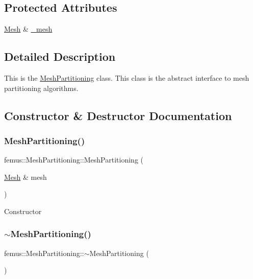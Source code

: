 \subsection*{Protected Attributes}
\begin{DoxyCompactItemize}
\item 
\mbox{\hyperlink{classfemus_1_1_mesh}{Mesh}} \& \mbox{\hyperlink{classfemus_1_1_mesh_partitioning_ac7a47c3281981a8c39a1cd9751b07955}{\+\_\+mesh}}
\end{DoxyCompactItemize}


\subsection{Detailed Description}
This is the {\ttfamily \mbox{\hyperlink{classfemus_1_1_mesh_partitioning}{Mesh\+Partitioning}}} class. This class is the abstract interface to mesh partitioning algorithms. 

\subsection{Constructor \& Destructor Documentation}
\mbox{\label{classfemus_1_1_mesh_partitioning_ab696b03d5a62ffae63e70edd0b5b0617}} 
\subsubsection{\texorpdfstring{Mesh\+Partitioning()}{MeshPartitioning()}}
{\footnotesize\ttfamily femus\+::\+Mesh\+Partitioning\+::\+Mesh\+Partitioning (\begin{DoxyParamCaption}\item[{\mbox{\hyperlink{classfemus_1_1_mesh}{Mesh}} \&}]{mesh }\end{DoxyParamCaption})}

Constructor \mbox{\label{classfemus_1_1_mesh_partitioning_ad084882a08206ab78da52adaef56d7c6}} 
\subsubsection{\texorpdfstring{$\sim$\+Mesh\+Partitioning()}{~MeshPartitioning()}}
{\footnotesize\ttfamily femus\+::\+Mesh\+Partitioning\+::$\sim$\+Mesh\+Partitioning (\begin{DoxyParamCaption}{ }\end{DoxyParamCaption})\hspace{0.3cm}{\ttfamily [inline]}}

